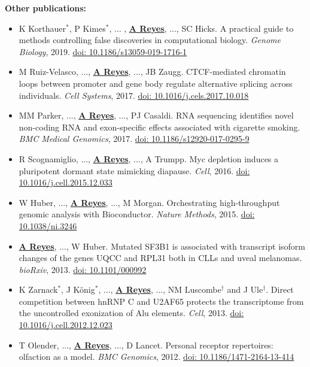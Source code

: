 \documentclass[11pt,a4paper,sans]{moderncv} %
\begin{document}
\vspace{.1cm}
\textbf{Other publications:}
\vspace{.1cm}
\begin{itemize}
\item K Korthauer$^{\ast}$, P Kimes$^{\ast}$, ... ,
  \textbf{\underline{A Reyes}}, ..., SC Hicks. A practical guide to
  methods controlling false discoveries in computational
  biology. \textit{Genome Biology}, 2019. \href{https://doi.org/10.1186/s13059-019-1716-1}{doi: 10.1186/s13059-019-1716-1}
\item M Ruiz-Velasco, ..., \textbf{\underline{A Reyes}}, ..., JB Zaugg. CTCF-mediated chromatin loops between promoter and gene body regulate alternative splicing across individuals. \textit{Cell Systems}, 2017. \href{http://dx.doi.org/10.1016/j.cels.2017.10.018}{doi: 10.1016/j.cels.2017.10.018}
\item MM Parker, ..., \textbf{\underline{A Reyes}}, ..., PJ Casaldi. RNA sequencing identifies novel non-coding RNA and exon-specific effects associated with cigarette smoking. \textit{BMC Medical Genomics}, 2017. \href{https://doi.org/10.1186/s12920-017-0295-9}{doi: 10.1186/s12920-017-0295-9}
\item R Scognamiglio, ..., \textbf{\underline{A Reyes}}, ..., A Trumpp. Myc depletion induces a pluripotent dormant state mimicking diapause. \textit{Cell}, 2016. \href{https://doi.org/10.1016/j.cell.2015.12.033}{doi: 10.1016/j.cell.2015.12.033}
\item W Huber, ..., \textbf{\underline{A Reyes}}, ..., M Morgan. Orchestrating high-throughput genomic analysis with Bioconductor. \textit{Nature Methods}, 2015. \href{https://doi.org/10.1038/ni.3246}{doi: 10.1038/ni.3246}
\item \textbf{\underline{A Reyes}}, ..., W Huber. Mutated SF3B1 is associated with transcript isoform changes of the genes UQCC and RPL31 both in CLLs and uveal melanomas. \textit{bioRxiv}, 2013. \href{https://doi.org/10.1101/000992}{doi: 10.1101/000992}
\item K Zarnack$^{\ast}$, J K\"{o}nig$^{\ast}$, ..., \textbf{\underline{A Reyes}}, ..., NM Luscombe$^{\dagger}$ and J Ule$^{\dagger}$. Direct competition between hnRNP C and U2AF65 protects the transcriptome from the uncontrolled exonization of Alu elements. \textit{Cell}, 2013. \href{https://doi.org/10.1016/j.cell.2012.12.023}{doi: 10.1016/j.cell.2012.12.023}
\item T Olender, ..., \textbf{\underline{A Reyes}}, ..., D Lancet. Personal receptor repertoires: olfaction as a model. \textit{BMC Genomics}, 2012. \href{https://doi.org/10.1186/1471-2164-13-414}{doi: 10.1186/1471-2164-13-414}
\end{itemize}
\vspace{-.13cm}
\end{document}
